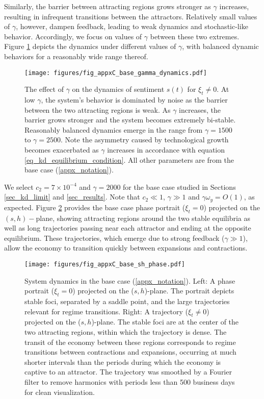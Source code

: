 Similarly, the barrier between attracting regions grows stronger as $\gamma$ increases, resulting in infrequent transitions between the attractors. Relatively small values of $\gamma$, however, dampen feedback, leading to weak dynamics and stochastic-like behavior. Accordingly, we focus on values of $\gamma$ between these two extremes. Figure \ref{fig_appxC_base_gamma_dynamics} depicts the dynamics under different values of $\gamma$, with balanced dynamic behaviors for a reasonably wide range thereof.

\begin{figure}
    \centering
    \texttt{[image: figures/fig\_appxC\_base\_gamma\_dynamics.pdf]}
    \caption{The effect of $\gamma$ on the dynamics of sentiment $s(t)$ for $\xi_t\neq0$. At low $\gamma$, the system's behavior is dominated by noise as the barrier between the two attracting regions is weak. As $\gamma$ increases, the barrier grows stronger and the system becomes extremely bi-stable. Reasonably balanced dynamics emerge in the range from $\gamma=1500$ to $\gamma=2500$. Note the asymmetry caused by technological growth becomes exacerbated as $\gamma$ increases in accordance with equation \eqref{eq_kd_equilibrium_condition}. All other parameters are from the base case (\ref{appx_notation}).}
    \label{fig_appxC_base_gamma_dynamics}
\end{figure}

We select $c_2=7\times10^{-4}$ and $\gamma=2000$ for the base case studied in Sections \ref{sec_kd_limit} and \ref{sec_results}. Note that $c_2\ll 1$, $\gamma\gg1$ and $\gamma\omega_y=O(1)$, as expected. Figure \ref{fig_appxC_base_sh_phase} provides the base case phase portrait ($\xi_t=0$) projected on the $(s,h)-$plane, showing attracting regions around the two stable equilibria as well as long trajectories passing near each attractor and ending at the opposite equilibrium. These trajectories, which emerge due to strong feedback ($\gamma\gg1$), allow the economy to transition quickly between expansions and contractions. 

\begin{figure}
    \centering
    \texttt{[image: figures/fig\_appxC\_base\_sh\_phase.pdf]}
    \caption{System dynamics in the base case (\ref{appx_notation}). Left: A phase portrait ($\xi_t=0$) projected on the ($s,h$)-plane. The portrait depicts stable foci, separated by a saddle point, and the large trajectories relevant for regime transitions. Right: A trajectory ($\xi_t\neq0$) projected on the ($s,h$)-plane. The stable foci are at the center of the two attracting regions, within which the trajectory is dense. The transit of the economy between these regions corresponds to regime transitions between contractions and expansions, occurring at much shorter intervals than the periods during which the economy is captive to an attractor. The trajectory was smoothed by a Fourier filter to remove harmonics with periods less than 500 business days for clean visualization.}
    \label{fig_appxC_base_sh_phase}
\end{figure}

